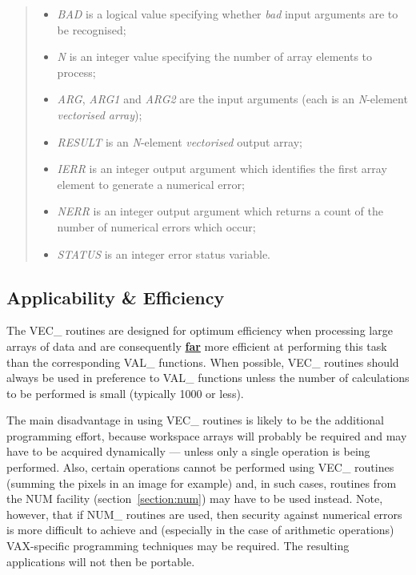\documentclass[11pt,nolof]{starlink}
\providecommand{\name}[1]{#1}
\providecommand{\fortvar}[1]{\emph{#1}}
\begin{document}
\begin{quote}
\begin{itemize}

\item \fortvar{BAD} is a logical value specifying whether \emph{bad}
input arguments are to be recognised;

\item \fortvar{N} is an integer value specifying the number of array
elements to process;

\item \fortvar{ARG}, \fortvar{ARG1} and \fortvar{ARG2} are the input
arguments (each is an \fortvar{N}-element \emph{vectorised array});

\item \fortvar{RESULT} is an \fortvar{N}-element \emph{vectorised} output
array;

\item \fortvar{IERR} is an integer output argument which identifies the
first array element to generate a numerical error;

\item \fortvar{NERR} is an integer output argument which returns a count of the
number of numerical errors which occur;

\item \fortvar{STATUS} is an integer error status variable.

\end{itemize}
\end{quote}

\subsection{Applicability \& Efficiency}

The \name{VEC\_} routines are designed for optimum efficiency when
processing large arrays of data and are consequently \textbf{\underline{far}}
more efficient at performing this task than the corresponding \name{VAL\_}
functions.
When possible, \name{VEC\_} routines should always be used in preference to
\name{VAL\_} functions unless the number of calculations to be performed is
small (typically 1000 or less).

The main disadvantage in using \name{VEC\_} routines is likely to be the
additional programming effort, because workspace arrays will probably be
required and may have to be acquired dynamically --- unless only a single
operation is being performed.
Also, certain operations cannot be performed using \name{VEC\_} routines
(summing the pixels in an image for example) and, in such cases,
routines from the \name{NUM} facility (section~\ref{section:num}) may have
to be used instead.
Note, however, that if \name{NUM\_} routines are used, then security against
numerical errors is more difficult to achieve and (especially in the case of
arithmetic operations) \name{VAX}-specific programming techniques may be
required.
The resulting applications will not then be portable.
\end{document}
